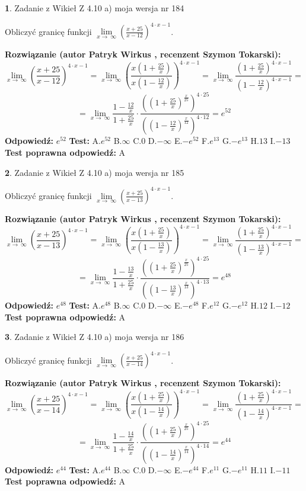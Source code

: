\documentclass[12pt, a4paper]{article}
\theoremstyle{definition} %
\newtheorem{zad}{}
\newcommand{\zadStart}[1]{\begin{zad}#1\newline}
\newcommand{\zadStop}{\end{zad}}
\newcommand{\rozwStart}[2]{\noindent \textbf{Rozwiązanie (autor #1 , recenzent #2): }\newline}
\newcommand{\rozwStop}{\newline}
\newcommand{\odpStart}{\noindent \textbf{Odpowiedź:}\newline}
\newcommand{\odpStop}{\newline}
\newcommand{\testStart}{\noindent \textbf{Test:}\newline}
\newcommand{\testStop}{\newline}
\newcommand{\kluczStart}{\noindent \textbf{Test poprawna odpowiedź:}\newline}
\newcommand{\kluczStop}{\newline}
\begin{document}
\zadStart{Zadanie z Wikieł Z 4.10 a) moja wersja nr 184}

Obliczyć granicę funkcji  $\lim\limits_{x\to\ \infty}(\frac{x+25}{x-12})^{4\cdot x-1}$.
\zadStop
\rozwStart{Patryk Wirkus}{Szymon Tokarski}
$$\lim\limits_{x\to\ \infty}(\frac{x+25}{x-12})^{4\cdot x-1} = \lim\limits_{x\to\ \infty}(\frac{x(1+\frac{25}{x})}{x(1-\frac{12}{x})})^{4\cdot x-1}=\lim\limits_{x\to\ \infty}\frac{(1+\frac{25}{x})^{4\cdot x-1}}{(1-\frac{12}{x})^{4\cdot x-1}}=$$
$$=\lim\limits_{x\to\ \infty}\frac{1-\frac{12}{x}}{1+\frac{25}{x}}\cdot\frac{((1+\frac{25}{x})^{\frac{x}{25}})^{4\cdot25}}{((1-\frac{12}{x})^{\frac{x}{12}})^{4\cdot12}}=e^{52}$$
\rozwStop
\odpStart
$e^{52}$
\odpStop
\testStart
A.$e^{52}$ B.$\infty$ C.$0$ D.$-\infty$ E.$-e^{52}$
F.$e^{13}$ G.$-e^{13}$
H.$13$
I.$-13$
\testStop
\kluczStart
A
\kluczStop



\zadStart{Zadanie z Wikieł Z 4.10 a) moja wersja nr 185}

Obliczyć granicę funkcji  $\lim\limits_{x\to\ \infty}(\frac{x+25}{x-13})^{4\cdot x-1}$.
\zadStop
\rozwStart{Patryk Wirkus}{Szymon Tokarski}
$$\lim\limits_{x\to\ \infty}(\frac{x+25}{x-13})^{4\cdot x-1} = \lim\limits_{x\to\ \infty}(\frac{x(1+\frac{25}{x})}{x(1-\frac{13}{x})})^{4\cdot x-1}=\lim\limits_{x\to\ \infty}\frac{(1+\frac{25}{x})^{4\cdot x-1}}{(1-\frac{13}{x})^{4\cdot x-1}}=$$
$$=\lim\limits_{x\to\ \infty}\frac{1-\frac{13}{x}}{1+\frac{25}{x}}\cdot\frac{((1+\frac{25}{x})^{\frac{x}{25}})^{4\cdot25}}{((1-\frac{13}{x})^{\frac{x}{13}})^{4\cdot13}}=e^{48}$$
\rozwStop
\odpStart
$e^{48}$
\odpStop
\testStart
A.$e^{48}$ B.$\infty$ C.$0$ D.$-\infty$ E.$-e^{48}$
F.$e^{12}$ G.$-e^{12}$
H.$12$
I.$-12$
\testStop
\kluczStart
A
\kluczStop



\zadStart{Zadanie z Wikieł Z 4.10 a) moja wersja nr 186}

Obliczyć granicę funkcji  $\lim\limits_{x\to\ \infty}(\frac{x+25}{x-14})^{4\cdot x-1}$.
\zadStop
\rozwStart{Patryk Wirkus}{Szymon Tokarski}
$$\lim\limits_{x\to\ \infty}(\frac{x+25}{x-14})^{4\cdot x-1} = \lim\limits_{x\to\ \infty}(\frac{x(1+\frac{25}{x})}{x(1-\frac{14}{x})})^{4\cdot x-1}=\lim\limits_{x\to\ \infty}\frac{(1+\frac{25}{x})^{4\cdot x-1}}{(1-\frac{14}{x})^{4\cdot x-1}}=$$
$$=\lim\limits_{x\to\ \infty}\frac{1-\frac{14}{x}}{1+\frac{25}{x}}\cdot\frac{((1+\frac{25}{x})^{\frac{x}{25}})^{4\cdot25}}{((1-\frac{14}{x})^{\frac{x}{14}})^{4\cdot14}}=e^{44}$$
\rozwStop
\odpStart
$e^{44}$
\odpStop
\testStart
A.$e^{44}$ B.$\infty$ C.$0$ D.$-\infty$ E.$-e^{44}$
F.$e^{11}$ G.$-e^{11}$
H.$11$
I.$-11$
\testStop
\kluczStart
A
\kluczStop
\end{document}

